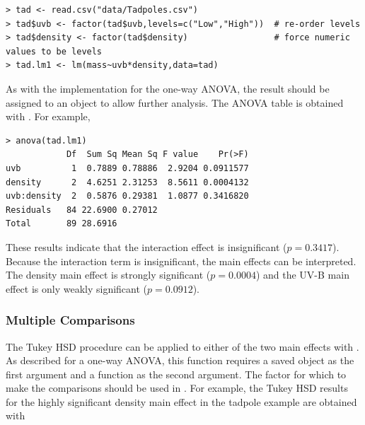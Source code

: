 \documentclass[10pt,openany]{book}\usepackage[]{graphicx}\usepackage[]{color}
\makeatletter
\newenvironment{kframe}{%
 \def\at@end@of@kframe{}%
 \ifinner\ifhmode%
  \def\at@end@of@kframe{\end{minipage}}%
  \begin{minipage}{\columnwidth}%
 \fi\fi%
 \def\FrameCommand##1{\hskip\@totalleftmargin \hskip-\fboxsep
 \colorbox{shadecolor}{##1}\hskip-\fboxsep
     \hskip-\linewidth \hskip-\@totalleftmargin \hskip\columnwidth}%
 \MakeFramed {\advance\hsize-\width
   \@totalleftmargin\z@ \linewidth\hsize
   \@setminipage}}%
 {\par\unskip\endMakeFramed%
 \at@end@of@kframe}
\newenvironment{knitrout}{}{} %
\makeatother
\begin{document}
\begin{knitrout}
\color{fgcolor}\begin{kframe}
\begin{verbatim}
> tad <- read.csv("data/Tadpoles.csv")
> tad$uvb <- factor(tad$uvb,levels=c("Low","High"))  # re-order levels
> tad$density <- factor(tad$density)                 # force numeric values to be levels
> tad.lm1 <- lm(mass~uvb*density,data=tad)
\end{verbatim}
\end{kframe}
\end{knitrout}

As with the  implementation for the one-way ANOVA, the result should be assigned to an object to allow further analysis.  The ANOVA table is obtained with .  For example,

\begin{knitrout}
\color{fgcolor}\begin{kframe}
\begin{verbatim}
> anova(tad.lm1)
            Df  Sum Sq Mean Sq F value    Pr(>F)
uvb          1  0.7889 0.78886  2.9204 0.0911577
density      2  4.6251 2.31253  8.5611 0.0004132
uvb:density  2  0.5876 0.29381  1.0877 0.3416820
Residuals   84 22.6900 0.27012                  
Total       89 28.6916                          
\end{verbatim}
\end{kframe}
\end{knitrout}

These results indicate that the interaction effect is insignificant ($p=0.3417$).  Because the interaction term is insignificant, the main effects can be interpreted.  The density main effect is strongly significant ($p=0.0004$) and the UV-B main effect is only weakly significant ($p=0.0912$).

\subsubsection*{Multiple Comparisons}
The Tukey HSD procedure can be applied to either of the two main effects with .  As described for a one-way ANOVA, this function requires a saved  object as the first argument and a  function as the second argument.  The factor for which to make the comparisons should be used in .  For example, the Tukey HSD results for the highly significant density main effect in the tadpole example are obtained with
\end{document}
